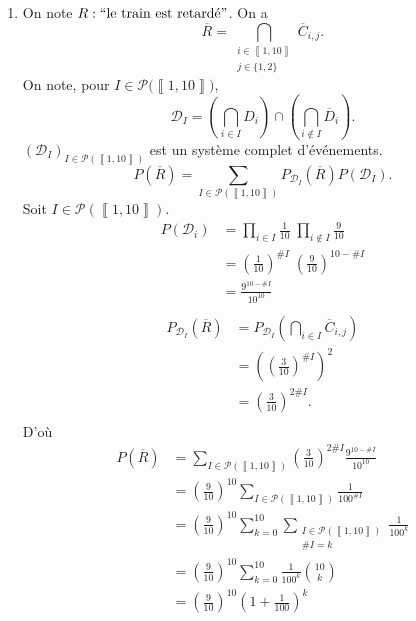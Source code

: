 \begin{enumerate}
	\item On note $R : ``\text{le train est retardé}"$. On a \[
			\overline{R} = \bigcap_{\substack{i \in \left\llbracket 1,10 \right\rrbracket\\j \in \{1,2\}}}\overline{C}_{i,j}
		.\] On note, pour $I \in \mathcal{P}\big(\left\llbracket 1,10 \right\rrbracket\big)$, \[
			\mathcal{D}_I = \left( \bigcap_{i \in I} D_i \right) \cap \left( \bigcap_{i \not\in I} \overline{D}_i \right)
		.\]
		$(\mathcal{D}_I)_{I\in\mathcal{P}(\left\llbracket 1,10 \right\rrbracket)}$ est un système complet d'événements. \[
			P(\overline{R}) = \sum_{I \in \mathcal{P}(\left\llbracket 1,10 \right\rrbracket)} P_{\mathcal{D}_I}(\overline{R}) P(\mathcal{D}_I)
		.\] Soit $I \in \mathcal{P}(\left\llbracket 1,10 \right\rrbracket)$.
		\begin{align*}
			P(\mathcal{D}_i) &= \prod_{i \in I} \frac{1}{10}\;\prod_{i\not\in I}\frac{9}{10}\\
			&= \left( \frac{1}{10} \right)^{\#I}\;\left( \frac{9}{10} \right)^{10 - \#I} \\
			&= \frac{9^{10-\#I}}{10^{10}} \\
		\end{align*}
		\begin{align*}
			P_{\mathcal{D}_I}(\overline{R}) &= P_{\mathcal{D}_I}\left( \bigcap_{i \in  I} \overline{C}_{i,j} \right) \\
			&= \left( \left( \frac{3}{10} \right)^{\#I} \right)^2 \\
			&= \left( \frac{3}{10} \right)^{2\#I}. \\
		\end{align*}
		D'où
		\begin{align*}
			P(\overline{R}) &= \sum_{I \in \mathcal{P}(\left\llbracket 1,10 \right\rrbracket)} \left( \frac{3}{10} \right)^{2\#I} \frac{9^{10-\#I}}{10^{10}}\\
			&= \left( \frac{9}{10} \right)^{10} \sum_{I \in \mathcal{P}(\left\llbracket 1,10 \right\rrbracket)} \frac{1}{100^{\#I}} \\
			&= \left( \frac{9}{10} \right)^{10} \sum_{k=0}^{10}\sum_{\substack{I \in \mathcal{P}(\left\llbracket 1,10 \right\rrbracket)\\\#I = k}} \frac{1}{100^k}\\
			&= \left( \frac{9}{10} \right)^{10} \sum_{k=0}^{10} \frac{1}{100^k} {10 \choose k}  \\
			&= \left( \frac{9}{10} \right)^{10} \left( 1+\frac{1}{100} \right)^k \\

\end{align*}
\end{enumerate}

